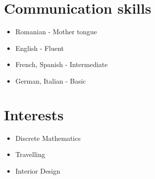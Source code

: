 \documentclass[10pt,a4paper,roman]{moderncv} %
\begin{document}
\begin{multicols*}{2}
\vspace{2mm}
\section{Communication skills}
\vspace{2mm}
\renewcommand{\listitemsymbol}{~} %
\begin{itemize}
\item{Romanian - Mother tongue}
\item{English - Fluent}
\item{French, Spanish - Intermediate}
\item{German, Italian - Basic}
\end{itemize}
\vspace{2mm}

\section{Interests}
\vspace{2mm}
\begin{itemize}

\item{Discrete Mathematics}
\item{Travelling}
\item{Interior Design}

\end{itemize}
\end{multicols*}







\end{document}
